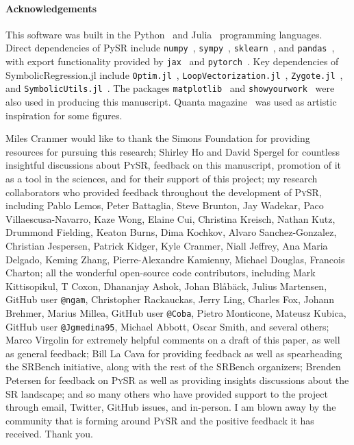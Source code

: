 \documentclass[letterpaper,twocolumn]{scrartcl}
\newcommand\pysr{\textsc{PySR}\xspace}
\begin{document}
\paragraph{Acknowledgements}
This software was built in the Python~\cite{vanrossumPythonReferenceManual2009} and Julia~\cite{julia} programming languages.
Direct dependencies of PySR include
\texttt{numpy}~\cite{numpy},
\texttt{sympy}~\cite{sympy},
\texttt{sklearn}~\cite{sklearn},
and
\texttt{pandas}~\cite{pandas},
with export functionality provided by
\texttt{jax}~\cite{jax}
and
\texttt{pytorch}~\cite{torch}.
Key dependencies of SymbolicRegression.jl include
\texttt{Optim.jl}~\cite{mogensenOptimMathematicalOptimization2018}, \texttt{LoopVectorization.jl}~\cite{elrodLoopVectorizationJlMacro2022}, \texttt{Zygote.jl}~\cite{innesDonUnrollAdjoint2018}, and
\texttt{SymbolicUtils.jl}~\cite{gowdaHighperformanceSymbolicnumericsMultiple2022}.
The packages \texttt{matplotlib}~\cite{matplotlib} and
\texttt{showyourwork}~\cite{lugerShowyourwork2021}
were also used in producing this manuscript.
Quanta magazine~\cite{woodPowerfulMachineScientists2022} was used as artistic inspiration for some figures.

Miles Cranmer would like to thank
the Simons Foundation for providing resources for pursuing this research;
Shirley Ho and David Spergel for countless insightful discussions about \pysr, feedback on this manuscript, promotion of it as a tool in the sciences, and for their support of this project;
my research collaborators who provided feedback throughout the development of \pysr, including Pablo Lemos, Peter Battaglia, Steve Brunton, Jay Wadekar, Paco Villaescusa-Navarro, Kaze Wong, Elaine Cui, Christina Kreisch, Nathan Kutz, Drummond Fielding, Keaton Burns, Dima Kochkov, Alvaro Sanchez-Gonzalez, Christian Jespersen, Patrick Kidger, Kyle Cranmer, Niall Jeffrey, Ana Maria Delgado, Keming Zhang, Pierre-Alexandre Kamienny, Michael Douglas, Francois Charton;
all the wonderful open-source code contributors, including Mark Kittisopikul, T Coxon, Dhananjay Ashok, Johan Blåbäck, Julius Martensen, GitHub user \texttt{@ngam}, Christopher Rackauckas, Jerry Ling, Charles Fox, Johann Brehmer, Marius Millea, GitHub user \texttt{@Coba}, Pietro Monticone, Mateusz Kubica, GitHub user \texttt{@Jgmedina95}, Michael Abbott, Oscar Smith, and several others;
Marco Virgolin for extremely helpful comments on a draft of this paper, as well as general feedback;
Bill La Cava for providing feedback as well as spearheading the SRBench initiative, along with the rest of the SRBench organizers;
Brenden Petersen for feedback on \pysr as well as providing insights discussions about the SR landscape;
and so many others who have provided support to the project through email, Twitter, GitHub issues, and in-person.
I am blown away by the community that is forming around \pysr and the positive feedback it has received. Thank you.





\end{document}
